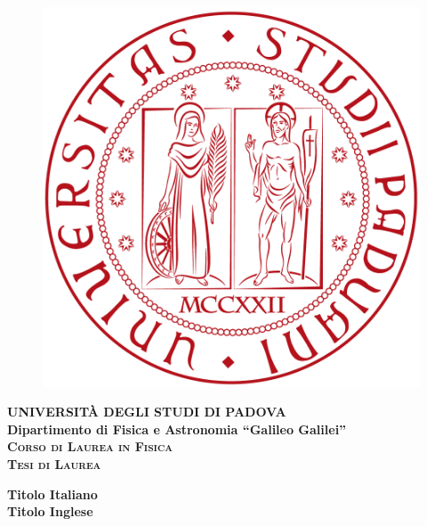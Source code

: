 \documentclass[a4paper,11pt]{book}
\begin{document}
\frontmatter
\begin{titlepage}
\mainmatter %
\vspace{5mm}
\begin{figure}[hbtp]
\centering
\includegraphics[scale=.13]{UNIPD.png}
\end{figure}
\vspace{5mm}
\begin{center}
{{\huge{\textsc{\bf UNIVERSIT\`A DEGLI STUDI DI PADOVA}}}\\}
\vspace{5mm}
{\Large{\bf Dipartimento di Fisica e Astronomia ``Galileo Galilei''}} \\
\vspace{5mm}
{\Large{\textsc{\bf Corso di Laurea in Fisica}}}\\
\vspace{20mm}
{\Large{\textsc{\bf Tesi di Laurea}}}\\
\vspace{10mm}
\begin{spacing}{3}
{\LARGE \textbf{Titolo Italiano}}\\
\vspace{8mm}
{\LARGE \textbf{Titolo Inglese}}\\
\end{spacing}
\vspace{8mm}
\end{center}


\end{titlepage}
\end{document}
